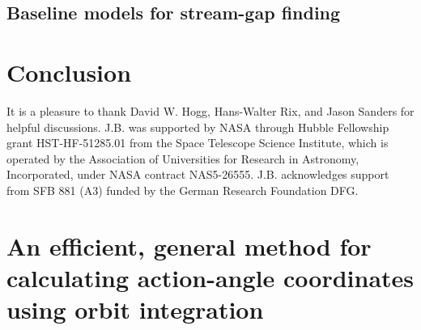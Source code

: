 \documentclass[12pt,preprint]{aastex}
\begin{document}
\subsection{Baseline models for stream-gap finding}

\section{Conclusion}\label{sec:conclusion}



\acknowledgements It is a pleasure to thank David W. Hogg, Hans-Walter
Rix, and Jason Sanders for helpful discussions. J.B. was supported by
NASA through Hubble Fellowship grant HST-HF-51285.01 from the Space
Telescope Science Institute, which is operated by the Association of
Universities for Research in Astronomy, Incorporated, under NASA
contract NAS5-26555. J.B.  acknowledges support from SFB 881 (A3)
funded by the German Research Foundation DFG.


\appendix

\section{An efficient, general method for calculating action-angle coordinates using orbit integration}\label{sec:aa}
\end{document}
